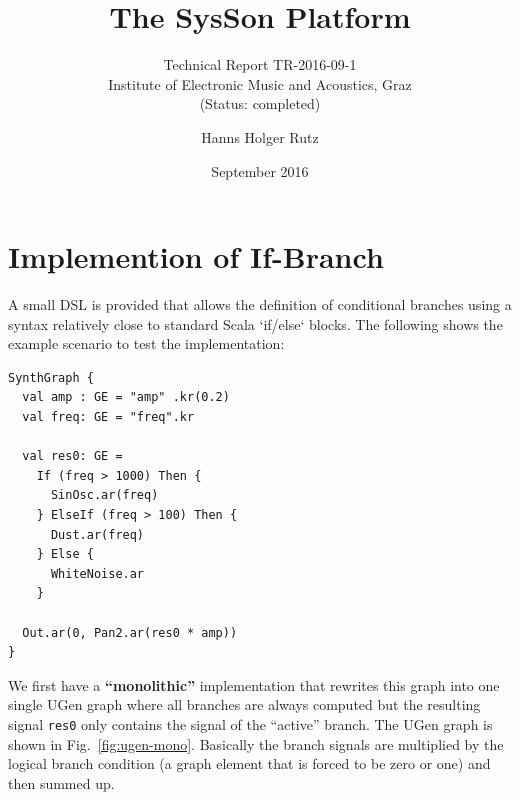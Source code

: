 \documentclass[11pt,a4paper]{article}
\title{The SysSon Platform}
\subtitle{Technical Report TR-2016-09-1\\Institute of Electronic Music and Acoustics, Graz\\(Status: completed)}
\author{Hanns Holger Rutz}
\date{September 2016}
\newcommand{\figref}[1]{Fig.~\ref{#1}}
\begin{document}
\maketitle
{}
\thispagestyle{empty}
\newpage
\section{Implemention of If-Branch}

A small DSL is provided that allows the definition of conditional branches using a syntax relatively close to standard Scala `if/else` blocks. The following shows the example scenario to test the implementation:
%
\begin{verbatim}
SynthGraph {
  val amp : GE = "amp" .kr(0.2)
  val freq: GE = "freq".kr

  val res0: GE = 
    If (freq > 1000) Then {
      SinOsc.ar(freq)
    } ElseIf (freq > 100) Then {
      Dust.ar(freq)
    } Else {
      WhiteNoise.ar
    }

  Out.ar(0, Pan2.ar(res0 * amp))
}
\end{verbatim}
%
We first have a \textbf{``monolithic''} implementation that rewrites this graph into one single UGen graph where all branches are always computed but the resulting signal \Verb!res0! only contains the signal of the ``active'' branch. The UGen graph is shown in \figref{fig:ugen-mono}. Basically the branch signals are multiplied by the logical branch condition (a graph element that is forced to be zero or one) and then summed up.
\end{document}
